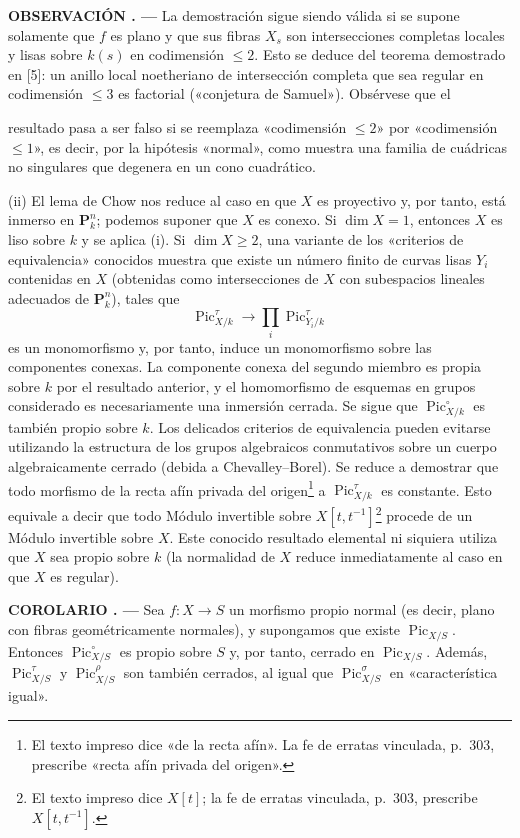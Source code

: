 \documentclass[11pt,twoside,openany]{book}
\numberwithin{equation}{section}
\newcommand{\src}[1]{%
  \phantomsection\hypertarget{src:#1}{}%
  \marginpar{\raggedleft\footnotesize\sffamily #1}%
}
\theoremstyle{plain}
\theoremstyle{definition}
\theoremstyle{remark}
\newcommand{\result}[2]{%
  \par\medskip\noindent\textbf{#1%
  \if\relax\detokenize{#2}\relax\else\space#2\fi. ---}\enspace
}
\newcommand{\FgaUnitKey}{frontmatter}
\renewcommand{\src}[1]{%
  \phantomsection\hypertarget{src:\FgaUnitKey:#1}{}%
  \marginpar{\raggedleft\footnotesize\sffamily #1}%
}
\theoremstyle{plain}
\theoremstyle{definition}
\theoremstyle{remark}
\begin{document}
\result{OBSERVACIÓN}{2.2} La demostración sigue siendo válida si se supone
solamente que $f$ es plano y que sus fibras $X_s$ son intersecciones completas
locales y lisas sobre $k(s)$ en codimensión $\leq2$. Esto se deduce del teorema
demostrado en [5]: un anillo local noetheriano de intersección completa que sea
regular en codimensión $\leq3$ es factorial («conjetura de Samuel»). Obsérvese
que el

\src{232}
resultado pasa a ser falso si se reemplaza «codimensión $\leq2$» por
«codimensión $\leq1$», es decir, por la hipótesis «normal», como muestra una
familia de cuádricas no singulares que degenera en un cono cuadrático.

(ii) El lema de Chow nos reduce al caso en que $X$ es proyectivo y, por tanto,
está inmerso en $\mathbf P_k^n$; podemos suponer que $X$ es conexo. Si
$\dim X=1$, entonces $X$ es liso sobre $k$ y se aplica (i). Si $\dim X\geq2$,
una variante de los «criterios de equivalencia» conocidos muestra que existe
un número finito de curvas lisas $Y_i$ contenidas en $X$ (obtenidas como
intersecciones de $X$ con subespacios lineales adecuados de $\mathbf P_k^n$),
tales que
\[
\operatorname{Pic}_{X/k}^\tau\longrightarrow
\prod_i\operatorname{Pic}_{Y_i/k}^\tau
\]
es un monomorfismo y, por tanto, induce un monomorfismo sobre las componentes
conexas. La componente conexa del segundo miembro es propia sobre $k$ por el
resultado anterior, y el homomorfismo de esquemas en grupos considerado es
necesariamente una inmersión cerrada. Se sigue que
$\operatorname{Pic}_{X/k}^\circ$ es también propio sobre $k$. Los delicados
criterios de equivalencia pueden evitarse utilizando la estructura de los
grupos algebraicos conmutativos sobre un cuerpo algebraicamente cerrado
(debida a Chevalley--Borel). Se reduce a demostrar que todo morfismo de la
recta afín privada del origen\footnote{El texto impreso dice «de la recta
afín». La fe de erratas vinculada, p.~303, prescribe «recta afín privada del
origen».} a $\operatorname{Pic}_{X/k}^\tau$ es constante. Esto equivale a decir
que todo Módulo invertible sobre $X[t,t^{-1}]$\footnote{El texto impreso dice
$X[t]$; la fe de erratas vinculada, p.~303, prescribe $X[t,t^{-1}]$.} procede
de un Módulo invertible sobre $X$. Este conocido resultado elemental ni siquiera
utiliza que $X$ sea propio sobre $k$ (la normalidad de $X$ reduce
inmediatamente al caso en que $X$ es regular).

\result{COROLARIO}{2.3} Sea $f:X\longrightarrow S$ un morfismo propio normal
(es decir, plano con fibras geométricamente normales), y supongamos que existe
$\operatorname{Pic}_{X/S}$. Entonces $\operatorname{Pic}_{X/S}^\circ$ es propio
sobre $S$ y, por tanto, cerrado en $\operatorname{Pic}_{X/S}$. Además,
$\operatorname{Pic}_{X/S}^\tau$ y $\operatorname{Pic}_{X/S}^\rho$ son también
cerrados, al igual que $\operatorname{Pic}_{X/S}^\sigma$ en «característica
igual».
\end{document}
